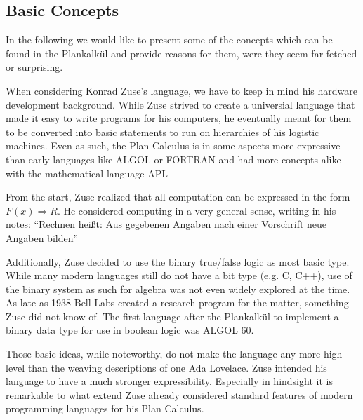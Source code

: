 \documentclass{llncs}
\begin{document}
 \subsection{Basic Concepts}
   In the following we would like to present some of 
   the concepts which can be found in the Plankalkül 
   and provide reasons for them, were they seem far-fetched 
   or surprising.
   
   When considering Konrad Zuse's language, we have to keep 
   in mind his hardware development background. While Zuse strived 
   to create a universial language that made it easy to write 
   programs for his computers, he eventually meant for them to
   be converted into basic statements to run on hierarchies of 
   his logistic machines. Even as such, the Plan Calculus is in some aspects more
   expressive than early languages like ALGOL or FORTRAN and had more 
   concepts alike with the mathematical language APL\cite{giloi2002konrad}
   
   From the start, Zuse realized that all computation can be expressed 
   in the form $F(x) \Rightarrow R$. He considered computing in a very 
   general sense, writing in his notes: ``Rechnen heißt: Aus
   gegebenen Angaben nach einer Vorschrift neue Angaben bilden''\cite{bauer1972plankalkuel}

   Additionally, Zuse decided to use the binary 
   true/false logic as most basic type. While many modern languages still 
   do not have a bit type (e.g. C, C++), use of the binary system as such 
   for algebra was not even widely explored at the time. As late as 1938 Bell Labs created a 
   research program for the matter, something Zuse did not know of. The first 
   language after the Plankalkül to implement a binary data type for use in 
   boolean logic was ALGOL 60.
   
   Those basic ideas, while noteworthy, do not make the language any more
   high-level than the weaving descriptions of one Ada Lovelace. 
   Zuse intended his language to have a much stronger expressibility. 
   Especially in hindsight it is remarkable 
   to what extend Zuse already considered standard features of modern 
   programming languages for his Plan Calculus.
   
\end{document}
